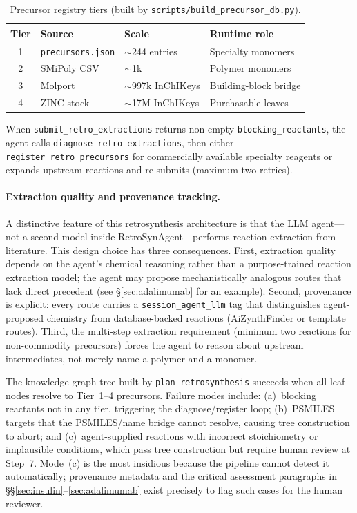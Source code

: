 \documentclass[twocolumn]{fairmeta}
\begin{document}
\begin{table}[t]
\centering
\caption{Precursor registry tiers (built by \texttt{scripts/build\_precursor\_db.py}).}
\label{tab:precursor_tiers}
\scriptsize
\setlength{\tabcolsep}{3pt}
\begin{tabularx}{\columnwidth}{clXl}
\toprule
Tier & Source & Scale & Runtime role \\
\midrule
1 & \texttt{precursors.json} & ${\sim}$244 entries & Specialty monomers \\
2 & SMiPoly CSV & ${\sim}$1k & Polymer monomers \\
3 & Molport & ${\sim}$997k InChIKeys & Building-block bridge \\
4 & ZINC stock & ${\sim}$17M InChIKeys & Purchasable leaves \\
\bottomrule
\end{tabularx}
\end{table}

When \texttt{submit\_retro\_extractions} returns non-empty \texttt{blocking\_reactants}, the agent calls \texttt{diagnose\_retro\_extractions}, then either \texttt{register\_retro\_precursors} for commercially available specialty reagents or expands upstream reactions and re-submits (maximum two retries).

\paragraph{Extraction quality and provenance tracking.}
A distinctive feature of this retrosynthesis architecture is that the LLM agent---not a second model inside RetroSynAgent---performs reaction extraction from literature.
This design choice has three consequences.
First, extraction quality depends on the agent's chemical reasoning rather than a purpose-trained reaction extraction model; the agent may propose mechanistically analogous routes that lack direct precedent (see \S\ref{sec:adalimumab} for an example).
Second, provenance is explicit: every route carries a \texttt{session\_agent\_llm} tag that distinguishes agent-proposed chemistry from database-backed reactions (AiZynthFinder or template routes).
Third, the multi-step extraction requirement (minimum two reactions for non-commodity precursors) forces the agent to reason about upstream intermediates, not merely name a polymer and a monomer.

The knowledge-graph tree built by \texttt{plan\_retrosynthesis} succeeds when all leaf nodes resolve to Tier~1--4 precursors.
Failure modes include: (a)~blocking reactants not in any tier, triggering the diagnose/register loop; (b)~PSMILES targets that the PSMILES/name bridge cannot resolve, causing tree construction to abort; and (c)~agent-supplied reactions with incorrect stoichiometry or implausible conditions, which pass tree construction but require human review at Step~7.
Mode~(c) is the most insidious because the pipeline cannot detect it automatically; provenance metadata and the critical assessment paragraphs in \S\S\ref{sec:insulin}--\ref{sec:adalimumab} exist precisely to flag such cases for the human reviewer.
\end{document}
